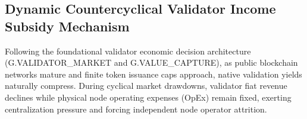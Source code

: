 \documentclass[11pt,a4paper]{article}
\begin{document}
\begin{table}[H]
\centering
\caption{Annualized AVAX Buyback and Burn Projections across TVL Milestones (Reference Price: AVAX = \$25.00)}
\label{tab:flywheel_table_expanded}
\end{table}

\subsection{Dynamic Countercyclical Validator Income Subsidy Mechanism}
Following the foundational validator economic decision architecture (G.VALIDATOR\_MARKET and G.VALUE\_CAPTURE), as public blockchain networks mature and finite token issuance caps approach, native validation yields naturally compress. During cyclical market drawdowns, validator fiat revenue declines while physical node operating expenses (OpEx) remain fixed, exerting centralization pressure and forcing independent node operator attrition.
\end{document}
